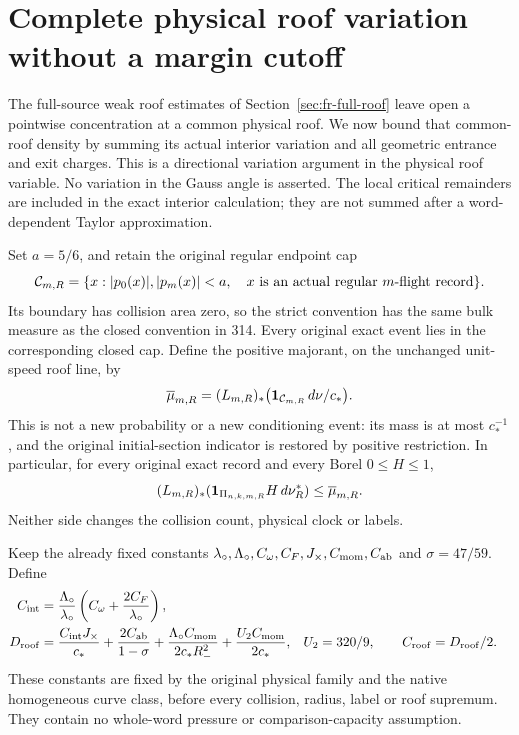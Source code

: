 \section{Complete physical roof variation without a margin cutoff}
\label{sec:rbv-complete}

The full-source weak roof estimates of Section~\ref{sec:fr-full-roof}
leave open a pointwise concentration at a common physical roof.
We now bound that common-roof density by summing its actual interior
variation and all geometric entrance and exit charges.  This is a
directional variation argument in the physical roof variable.  No
variation in the Gauss angle is asserted.  The local critical
remainders are included in the exact interior calculation; they are
not summed after a word-dependent Taylor approximation.

Set $a=5/6$, and retain the original regular endpoint cap
\[
 \mathcal C_{m,R}=\{x: |p_0(x)|,|p_m(x)|<a,\quad
                     x\hbox{ is an actual regular }m\hbox{-flight record}\}.
\]
Its boundary has collision area zero, so the strict convention has
the same bulk measure as the closed convention in 314.  Every
original exact event lies in the corresponding closed cap.  Define
the positive majorant, on the unchanged unit-speed roof line, by
\begin{equation}\label{eq:rbv-majorant}
 \overline\mu_{m,R}
      =(L_{m,R})_*\bigl(\mathbf1_{\mathcal C_{m,R}}\,d\nu/c_*\bigr).
\end{equation}
This is not a new probability or a new conditioning event: its
mass is at most $c_*^{-1}$, and the original initial-section
indicator is restored by positive restriction.  In particular,
for every original exact record and every Borel $0\le H\le1$,
\begin{equation}\label{eq:rbv-domination}
 (L_{m,R})_*(\mathbf1_{\Pi_{n,k,m,R}}H\,d\nu_R^*)
                  \le\overline\mu_{m,R}.
\end{equation}
Neither side changes the collision count, physical clock or labels.

Keep the already fixed constants $\lambda_\circ,\Lambda_\circ,
C_\omega,C_F,J_\times,C_{\rm mom},C_{\rm ab}$ and
$\sigma=47/59$.  Define
\begin{align}
 C_{\rm int}
   &=\frac{\Lambda_\circ}{\lambda_\circ}
                 \left(C_\omega+\frac{2C_F}{\lambda_\circ}\right),
                                                    \label{eq:rbv-constants}\\
 D_{\rm roof}
   &=\frac{C_{\rm int}J_\times}{c_*}
       +\frac{2C_{\rm ab}}{1-\sigma}
       +\frac{\Lambda_\circ C_{\rm mom}}{2c_*R_-^2}
       +\frac{U_2 C_{\rm mom}}{2c_*},
 & U_2&=320/9,\qquad C_{\rm roof}=D_{\rm roof}/2. \notag
\end{align}
These constants are fixed by the original physical family and the
native homogeneous curve class, before every collision, radius,
label or roof supremum.  They contain no whole-word pressure or
comparison-capacity assumption.


